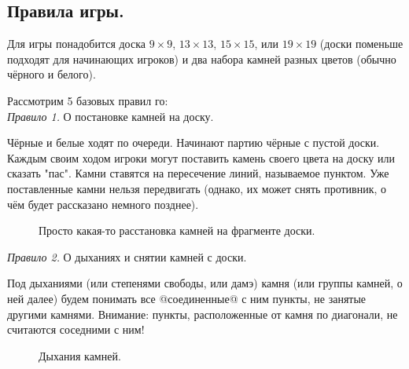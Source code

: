 \documentclass[14pt,a4paper]{extarticle}
\newcommand{\stone}[3]{\filldraw[color=black, fill=#3, very thick](#1,#2) circle(0.45);}
\newcommand{\territory}[3]{\filldraw[color=black, fill=#3, very thick](#1, #2) circle(0.125);}
\begin{document}
\subsection*{Правила игры.}

Для игры понадобится доска $9\times9$, $13\times13$, $15\times15$, или $19\times19$ (доски поменьше подходят для начинающих игроков) и два набора камней разных цветов (обычно чёрного и белого).

Рассмотрим 5 базовых правил го:\\

\textit{Правило 1.} О постановке камней на доску.

Чёрные и белые ходят по очереди. Начинают партию чёрные с пустой доски. Каждым своим ходом игроки могут поставить камень своего цвета на доску или сказать "пас". Камни ставятся на пересечение линий, называемое пунктом. Уже поставленные камни нельзя передвигать (однако, их может снять противник, о чём будет рассказано немного позднее).

\begin{figure}[h]
    \centering
    \caption{Просто какая-то расстановка камней на фрагменте доски.} \label{1}
\end{figure}

\textit{Правило 2.} О дыханиях и снятии камней с доски.

Под дыханиями (или степенями свободы, или дамэ) камня (или группы камней, о ней далее) будем понимать все @соединенные@ с ним пункты, не занятые другими камнями. Внимание: пункты, расположенные от камня по диагонали, не считаются соседними с ним!


\newpage


\begin{figure}[h!]
    \centering
    \caption{Дыхания камней.} \label{2}
\end{figure}
\end{document}
